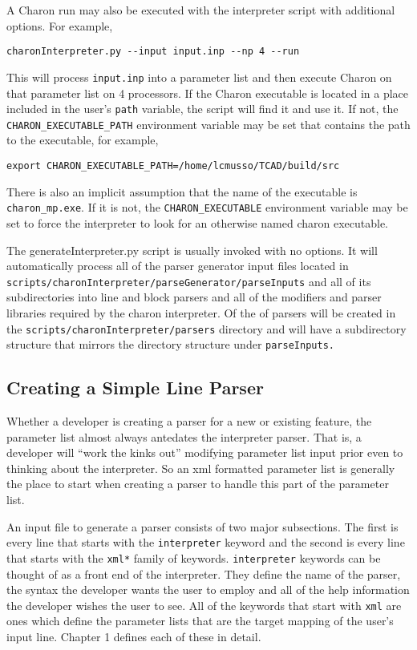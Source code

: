A Charon run may also be executed with the interpreter script with
additional options.  For example,
\begin{lstlisting}
charonInterpreter.py --input input.inp --np 4 --run
\end{lstlisting}
This will process \texttt{input.inp} into a parameter list and then
execute Charon on that parameter list on 4 processors.  If the Charon
executable is located in a place included in the user's \texttt{path}
variable, the script will find it and use it.  If not, the
\texttt{CHARON\_EXECUTABLE\_PATH} environment variable may be set that
contains the path to the executable, for example,
\begin{lstlisting}
export CHARON_EXECUTABLE_PATH=/home/lcmusso/TCAD/build/src
\end{lstlisting}
There is also an implicit assumption that the name of the executable
is \texttt{charon\_mp.exe}.  If it is not, the
\texttt{CHARON\_EXECUTABLE} environment variable may be set to force
the interpreter to look for an otherwise named charon executable.

The generateInterpreter.py script is usually invoked with no options.
It will automatically process all of the parser generator input files
located in
\texttt{scripts/charonInterpreter/parseGenerator/parseInputs} and all
of its subdirectories into line and block parsers and all of the
modifiers and parser libraries required by the charon interpreter.  Of
the of parsers will be created in the
\texttt{scripts/charonInterpreter/parsers} directory and will have a
subdirectory structure that mirrors the directory structure under
\texttt{parseInputs.}


\subsection{Creating a Simple Line Parser}

Whether a developer is creating a parser for a new or existing
feature, the parameter list almost always antedates the interpreter
parser.  That is, a developer will ``work the kinks out'' modifying
parameter list input prior even to thinking about the interpreter.  So
an xml formatted parameter list is generally the place to start when
creating a parser to handle this part of the parameter list.

An input file to generate a parser consists of two major subsections.
The first is every line that starts with the \texttt{interpreter}
keyword and the second is every line that starts with the
\texttt{xml*} family of keywords.  \texttt{interpreter} keywords can be
thought of as a front end of the interpreter.  They define the name of
the parser, the syntax the developer wants the user to employ and all
of the help information the developer wishes the user to see.  All of
the keywords that start with \texttt{xml} are ones which define the
parameter lists that are the target mapping of the user's input line.
Chapter 1 defines each of these in detail.

